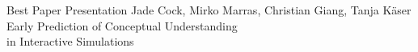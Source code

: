 \documentclass[a4paper,landscape]{article} %
\begin{document}
\diploma
    {Best Paper Presentation}
    {Jade Cock, Mirko Marras, Christian Giang, Tanja Käser}
    {Early Prediction of Conceptual Understanding\\ in Interactive Simulations}
\hfill
\end{document}
